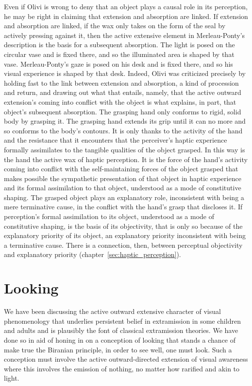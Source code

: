 Even if Olivi is wrong to deny that an object plays a causal role in its perception, he may be right in claiming that extension and absorption are linked. If extension and absorption are linked, if the wax only takes on the form of the seal by actively pressing against it, then the active extensive element in Merleau-Ponty's description is the basis for a subsequent absorption. The light is posed on the circular vase and is fixed there, and so the illuminated area is shaped by that vase. Merleau-Ponty's gaze is posed on his desk and is fixed there, and so his visual experience is shaped by that desk. Indeed, Olivi was criticized precisely by holding fast to the link between extension and absorption, a kind of procession and return, and drawing out what that entails, namely, that the active outward extension's coming into conflict with the object is what explains, in part, that object's subsequent absorption. The grasping hand only conforms to rigid, solid body by grasping it. The grasping hand extends its grip until it can no more and so conforms to the body's contours. It is only thanks to the activity of the hand and the resistance that it encounters that the perceiver's haptic experience formally assimilates to the tangible qualities of the object grasped. In this way is the hand the active wax of haptic perception. It is the force of the hand's activity coming into conflict with the self-maintaining forces of the object grasped that makes possible the sympathetic presentation of that object in haptic experience and its formal assimilation to that object, understood as a mode of constitutive shaping. The grasped object plays an explanatory role, inconsistent with being a mere terminative cause, in the conflict with the hand's grasp that discloses it. If perception's formal assimilation to its object, understood as a mode of constitutive shaping, is the basis of its objectivity, that is only so because of the explanatory priority of its object, an explanatory priority inconsistent with being a terminative cause. There is a connection, then, between perceptual objectivity and explanatory priority (chapter~\ref{sec:haptic_perception}).


\section{Looking} %
\label{sec:looking}

We have been discussing the active outward extensive character of visual phenomenology that underlies persistent belief in extramission in some children and adults and is plausibly the font of classical extramission theories. We have done so in aid of honing in on a conception of looking that stands a chance of make true the Biranian principle, in order to see well, one must look. Such a conception must involve the active outward-directed extension of visual awareness where this involves the emission of nothing, no matter how rarified and akin to light. 

